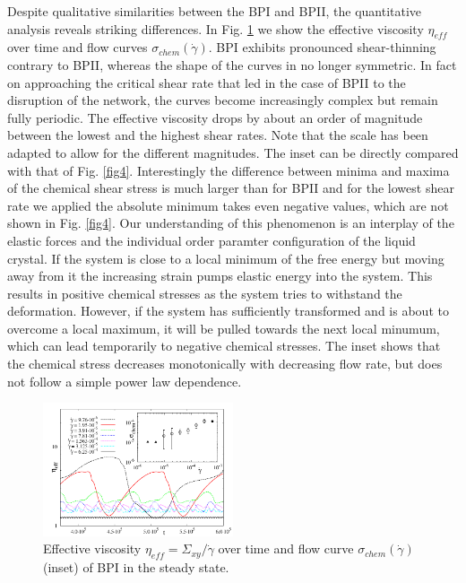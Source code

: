 \documentclass[aps,pre,twocolumn,groupedaddress]{revtex4-1}
\begin{document}
Despite qualitative similarities between the BPI and BPII, the quantitative analysis reveals striking differences.
In Fig. \ref{fig8} we show the effective viscosity $\eta_{eff}$ over time and flow curves $\sigma_{chem}(\dot{\gamma})$. 
BPI exhibits pronounced shear-thinning contrary to BPII, whereas the shape of the curves in no longer symmetric.
In fact on approaching the critical shear rate that led in the case of BPII to the disruption of the network, the curves become increasingly complex but remain fully periodic.
The effective viscosity drops by about an order of magnitude between the lowest and the highest shear rates.
Note that the scale has been adapted to allow for the different magnitudes.
The inset can be directly compared with that of Fig. \ref{fig4}.
Interestingly the difference between minima and maxima of the chemical shear stress is much larger than for BPII and for the lowest shear rate we applied the absolute minimum takes even negative values, which are not shown in Fig. \ref{fig4}.
Our understanding of this phenomenon is an interplay of the elastic forces and the individual order paramter configuration of the liquid crystal.
If the system is close to a local minimum of the free energy but moving away from it the increasing strain pumps elastic energy into the system. 
This results in positive chemical stresses as the system tries to withstand the deformation.
However, if the system has sufficiently transformed and is about to overcome a local maximum, it will be pulled towards the next local minumum, which can lead temporarily to negative chemical stresses. 
The inset shows that the chemical stress decreases monotonically with decreasing flow rate, but does not follow a simple power law dependence.
 
\begin{figure}[h]
\includegraphics[width=0.5\textwidth]{stress_bp1.pdf}
\caption{Effective viscosity $\eta_{eff}=\Sigma_{xy}/\dot{\gamma}$ over time and flow curve $\sigma_{chem}(\dot{\gamma})$ (inset) of BPI in the steady state.}
\label{fig8}
\end{figure}
\end{document}
